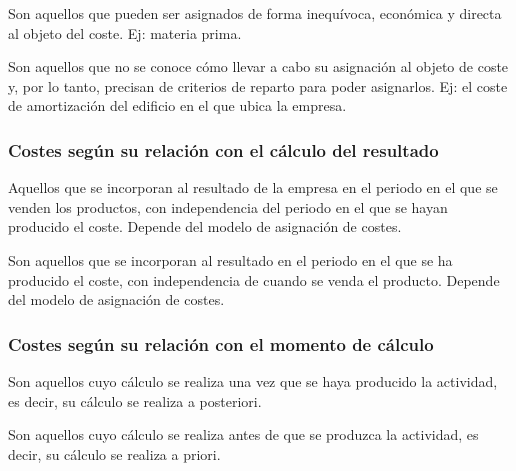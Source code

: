 \documentclass[12pt]{book} %
\begin{document}
\begin{definicion}
Son aquellos que pueden ser asignados de forma inequívoca, económica y directa al objeto del coste. Ej: materia prima.
\end{definicion}

\begin{definicion}
Son aquellos que no se conoce cómo llevar a cabo su asignación al objeto de coste y, por lo tanto, precisan de criterios de reparto para poder asignarlos. Ej: el coste de amortización del edificio en el que ubica la empresa.
\end{definicion}

\hypertarget{costes-seguxfan-su-relaciuxf3n-con-el-cuxe1lculo-del-resultado}{%
\subsubsection{Costes según su relación con el cálculo del
resultado}\label{costes-seguxfan-su-relaciuxf3n-con-el-cuxe1lculo-del-resultado}}

\begin{definicion}
Aquellos que se incorporan al resultado de la empresa en el periodo en el que se venden los productos, con independencia del periodo en el que se hayan producido el coste. Depende del modelo de asignación de costes.
\end{definicion}

\begin{definicion}
Son aquellos que se incorporan al resultado en el periodo en el que se ha producido el coste, con independencia de cuando se venda el producto. Depende del modelo de asignación de costes.
\end{definicion}

\hypertarget{costes-seguxfan-su-relaciuxf3n-con-el-momento-de-cuxe1lculo}{%
\subsubsection{Costes según su relación con el momento de
cálculo}\label{costes-seguxfan-su-relaciuxf3n-con-el-momento-de-cuxe1lculo}}

\begin{definicion}
Son aquellos cuyo cálculo se realiza una vez que se haya producido la actividad, es decir, su cálculo se realiza a posteriori.
\end{definicion}

\begin{definicion}
Son aquellos cuyo cálculo se realiza antes de que se produzca la actividad, es decir, su cálculo se realiza a priori.
\end{definicion}
\end{document}
